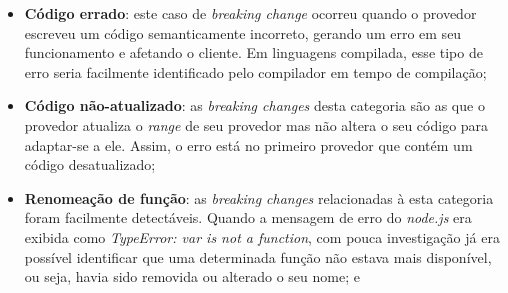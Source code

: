 \begin{itemize}


    \item \textbf{Código errado}: este caso de \textit{breaking change} ocorreu quando o provedor escreveu um código semanticamente incorreto, gerando um erro em seu funcionamento e afetando o cliente. Em linguagens compilada, esse tipo de erro seria facilmente identificado pelo compilador em tempo de compilação; %


    \item \textbf{Código não-atualizado}: as \textit{breaking changes} desta categoria são as que o provedor atualiza o \textit{range} de seu provedor mas não altera o seu código para adaptar-se a ele. Assim, o erro está no primeiro provedor que contém um código desatualizado;

    \item \textbf{Renomeação de função}: as \textit{breaking changes} relacionadas à esta categoria foram facilmente detectáveis. Quando a mensagem de erro do \textit{node.js} era exibida como \textit{TypeError: var is not a function}, com pouca investigação já era possível identificar que uma determinada função não estava mais disponível, ou seja, havia sido removida ou alterado o seu nome; e


\end{itemize}
